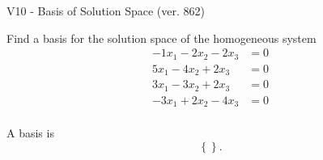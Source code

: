 \begin{exercise}
  \begin{exerciseTitle}V10 - Basis of Solution Space (ver. 862)\end{exerciseTitle}
  \begin{exerciseStatement}
    Find a basis for the solution space of the homogeneous system 
\begin{align*}
 -1 x_ 1 -2 x_ 2 -2 x_ 3 &= 0  \\ 
  5 x_ 1 -4 x_ 2 + 2 x_ 3 &= 0  \\ 
  3 x_ 1 -3 x_ 2 + 2 x_ 3 &= 0  \\ 
  -3 x_ 1 + 2 x_ 2 -4 x_ 3 &= 0  \\ 
 \end{align*}


 
  \end{exerciseStatement}

  \begin{exerciseAnswer}
   A basis is   
\[\left\{\right\}.\]

  


  \end{exerciseAnswer}
\end{exercise}